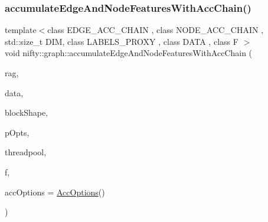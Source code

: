 \subsubsection{\texorpdfstring{accumulate\+Edge\+And\+Node\+Features\+With\+Acc\+Chain()}{accumulateEdgeAndNodeFeaturesWithAccChain()}\hspace{0.1cm}{\footnotesize\ttfamily [1/2]}}
{\footnotesize\ttfamily template$<$class E\+D\+G\+E\+\_\+\+A\+C\+C\+\_\+\+C\+H\+A\+IN , class N\+O\+D\+E\+\_\+\+A\+C\+C\+\_\+\+C\+H\+A\+IN , std\+::size\+\_\+t D\+IM, class L\+A\+B\+E\+L\+S\+\_\+\+P\+R\+O\+XY , class D\+A\+TA , class F $>$ \\
void nifty\+::graph\+::accumulate\+Edge\+And\+Node\+Features\+With\+Acc\+Chain (\begin{DoxyParamCaption}\item[{const \hyperlink{classnifty_1_1graph_1_1GridRag}{Grid\+Rag}$<$ D\+IM, L\+A\+B\+E\+L\+S\+\_\+\+P\+R\+O\+XY $>$ \&}]{rag,  }\item[{const D\+A\+TA \&}]{data,  }\item[{const \hyperlink{namespacenifty_1_1array_a683f151f19c851754e0c6d55ed16a0c2}{array\+::\+Static\+Array}$<$ int64\+\_\+t, D\+IM $>$ \&}]{block\+Shape,  }\item[{const \hyperlink{classnifty_1_1parallel_1_1ParallelOptions}{parallel\+::\+Parallel\+Options} \&}]{p\+Opts,  }\item[{\hyperlink{classnifty_1_1parallel_1_1ThreadPool}{parallel\+::\+Thread\+Pool} \&}]{threadpool,  }\item[{F \&\&}]{f,  }\item[{const \hyperlink{structnifty_1_1graph_1_1AccOptions}{Acc\+Options} \&}]{acc\+Options = {\ttfamily \hyperlink{structnifty_1_1graph_1_1AccOptions}{Acc\+Options}()} }\end{DoxyParamCaption})}

\mbox{\label{namespacenifty_1_1graph_a5e388756ae7e421f92ef5f78494b94d7}} 
